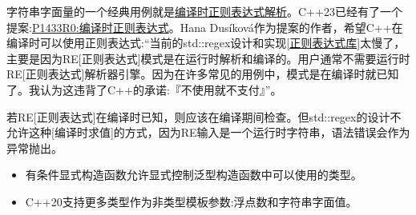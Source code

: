 \begin{tcolorbox}[breakable,enhanced jigsaw,colback=mygreen!5!white,colframe=mygreen!75!black,title={编译时的正则表达式}]

字符串字面量的一个经典用例就是\href{https://github.com/hanickadot/compile-time-regular-expressions}{编译时正则表达式解析}。C++23已经有了一个提案:\href{http://www.open-std.org/jtc1/sc22/wg21/docs/papers/2019/p1433r0.pdf}{P1433R0:编译时正则表达式}。Hana Dusíková作为提案的作者，希望C++在编译时可以使用正则表达式:“当前的std::regex设计和实现[\href{https://en.cppreference.com/w/cpp/regex}{正则表达式库}]太慢了，主要是因为RE[正则表达式]模式是在运行时解析和编译的。用户通常不需要运行时RE[正则表达式]解析器引擎。因为在许多常见的用例中，模式是在编译时就已知了。我认为这违背了C++的承诺:『不使用就不支付』”。

若RE[正则表达式]在编译时已知，则应该在编译期间检查。但std::regex的设计不允许这种[编译时求值]的方式，因为RE输入是一个运行时字符串，语法错误会作为异常抛出。

\end{tcolorbox}

\begin{tcolorbox}[breakable,enhanced jigsaw,colback=mygreen!5!white,colframe=mygreen!75!black,title={总结}]
\begin{itemize}
\item 
有条件显式构造函数允许显式控制泛型构造函数中可以使用的类型。

\item 
C++20支持更多类型作为非类型模板参数:浮点数和字符串字面值。
\end{itemize}
\end{tcolorbox}

\newpage